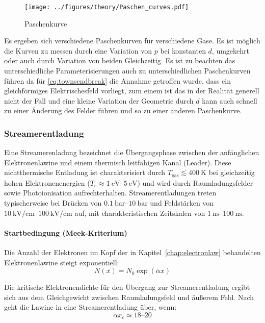   \begin{figure}[htbp]
    \centering
    \texttt{[image: ../figures/theory/Paschen\_curves.pdf]}
    \caption{Paschenkurve}
    \label{fig:paschencurve}
  \end{figure}

Es ergeben sich verschiedene Paschenkurven für verschiedene Gase. Es ist möglich die Kurven zu messen durch eine Variation von \(p\) bei konstanten \(d\), umgekehrt oder auch durch Variation von beiden Gleichzeitig. Es ist zu beachten das unterschiedliche Parameterisierungen auch zu unterschiedlichen Paschenkurven führen da für \eqref{eq:townsendbreak} die Annahme getroffen wurde, dass ein gleichförmiges Elektrischesfeld vorliegt, zum einem ist das in der Realität generell nicht der Fall und eine kleine Variation der Geometrie durch \(d\) kann auch schnell zu einer Änderung des Felder führen und so zu einer anderen Paschenkurve. \cite{kuffel2000}


\subsubsection{Streamerentladung}
\label{sec:streamerdischarge}
Eine Streamerenladung bezeichnet die Übergangsphase zwischen der anfänglichen Elektronenlawine und einem thermisch leitfähigen Kanal (Leader).  Diese nichtthermische Entladung ist charakterisiert durch $T_{\text{gas}} \lesssim \SI{400}{\kelvin}$ bei gleichzeitig hohen Elektronenenergien ($T_e \approx \SIrange{1}{5}{\electronvolt}$) und wird durch Raumladungsfelder sowie Photoionisation aufrechterhalten. Streamerentladungen treten typischerweise bei Drücken von $\SIrange{0.1}{10}{\bar}$ und Feldstärken von $\SIrange{10}{100}{\kilo\volt\per\centi\meter}$ auf, mit charakteristischen Zeitskalen von $\SIrange{1}{100}{\nano\second}$.

\paragraph{Startbedingung (Meek-Kriterium)}
Die Anzahl der Elektronen im Kopf der in Kapitel~\ref{chap:electronlaw} behandelten Elektronenlawine steigt exponentiell:
\begin{equation}
    N(x) = N_0 \exp(\overline{\alpha} x)
\end{equation}

Die kritische Elektronendichte für den Übergang zur Streamerentladung ergibt sich aus dem Gleichgewicht zwischen Raumladungsfeld und äußerem Feld. Nach \textcite{meek1940} geht die Lawine in eine Streamerentladung über, wenn:
\begin{equation}
    \overline{\alpha} x_c \simeq 18\text{--}20
    \label{eq:meek}
\end{equation}

